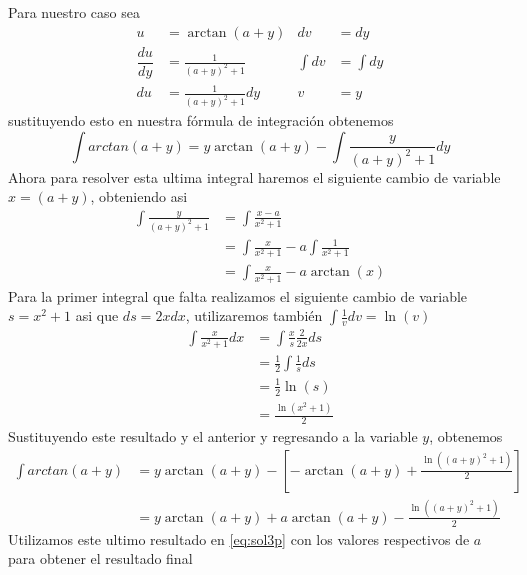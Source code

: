         Para nuestro caso sea
        \begin{align*}
            u & = \arctan(a + y) & dv & = dy  \\
            \dfrac{d u}{dy} & = \frac{1}{(a+y)^2 + 1} & \int dv & = \int dy \\
            du & = \frac{1}{(a+y)^2 + 1} dy & v &= y
        \end{align*}
        sustituyendo esto en nuestra fórmula de integración obtenemos
        \begin{equation*}
            \int arctan(a + y) = y \arctan(a + y) - \int \frac{y}{(a + y)^2 +1} dy
        \end{equation*}
        Ahora para resolver esta ultima integral haremos el siguiente cambio de variable $x = (a + y)$, obteniendo asi
        \begin{align*}
            \int \frac{y}{(a + y)^2 + 1} & = \int \frac{x - a}{x^2 + 1} \\
            & = \int \frac{x}{x^2 + 1} - a \int \frac{1}{x^2 + 1} \\
            & = \int \frac{x}{x^2 + 1} - a \arctan(x)
        \end{align*}
        Para la primer integral que falta realizamos el siguiente cambio de variable $ s = x^2 + 1$ asi que $ds = 2x dx $,
        utilizaremos también $ \int \frac{1}{v}dv = \ln(v)$
        \begin{align*}
            \int \frac{x}{x^2 + 1} dx & = \int \frac{x}{s}\frac{2}{2x}ds \\
            & = \frac{1}{2} \int \frac{1}{s}ds \\
            & = \frac{1}{2} \ln(s) \\
            & = \frac{\ln(x^2 +1)}{2}
        \end{align*}
        Sustituyendo este resultado y el anterior y regresando a la variable $y$, obtenemos
        \begin{align*}
            \int arctan(a + y) & = y \arctan(a + y) - \left[ - \arctan(a + y) + \frac{\ln((a + y)^2 +1)}{2} \right] \\
            & =  y \arctan(a + y) + a \arctan(a + y) - \frac{\ln((a + y)^2 +1)}{2}
        \end{align*}
        Utilizamos este ultimo resultado en \eqref{eq:sol3p} con los valores respectivos de $a$ para obtener el resultado final
